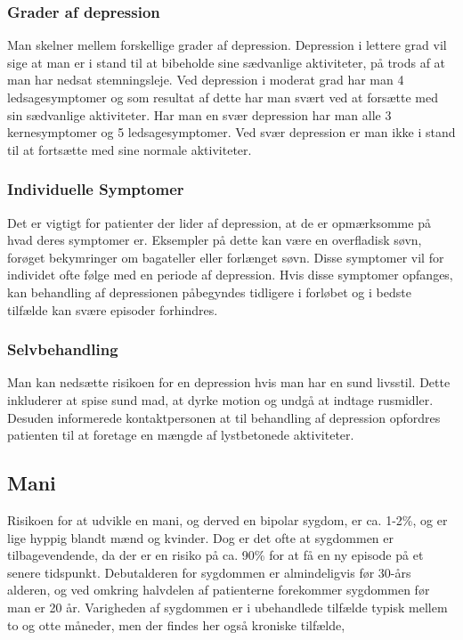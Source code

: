 \subsubsection{Grader af depression}
Man skelner mellem forskellige grader af depression.
Depression i lettere grad vil sige at man er i stand til at bibeholde sine sædvanlige aktiviteter, på trods af at man har nedsat stemningsleje.
Ved depression i moderat grad har man 4 ledsagesymptomer og som resultat af dette har man svært ved at forsætte med sin sædvanlige aktiviteter.
Har man en svær depression har man alle 3 kernesymptomer og 5 ledsagesymptomer.
Ved svær depression er man ikke i stand til at fortsætte med sine normale aktiviteter.

\subsubsection{Individuelle Symptomer}
Det er vigtigt for patienter der lider af depression, at de er opmærksomme på hvad deres symptomer er.
Eksempler på dette kan være en overfladisk søvn, forøget bekymringer om bagateller eller forlænget søvn.
Disse symptomer vil for individet ofte følge med en periode af depression.
Hvis disse symptomer opfanges, kan behandling af depressionen påbegyndes tidligere i forløbet og i bedste tilfælde kan svære episoder forhindres.
\subsubsection{Selvbehandling}
Man kan nedsætte risikoen for en depression hvis man har en sund livsstil.
Dette inkluderer at spise sund mad, at dyrke motion og undgå at indtage rusmidler.
Desuden informerede kontaktpersonen \citet{misc:janne-rasmussen} at til behandling af depression opfordres patienten til at foretage en mængde af lystbetonede aktiviteter.

\subsection{Mani}
Risikoen for at udvikle en mani, og derved en bipolar sygdom, er ca. 1-2\%, og er lige hyppig blandt mænd og kvinder.
Dog er det ofte at sygdommen er tilbagevendende, da der er en risiko på ca. 90\% for at få en ny episode på et senere tidspunkt.
Debutalderen for sygdommen er almindeligvis før 30-års alderen, og ved omkring halvdelen af patienterne forekommer sygdommen før man er 20 år.
Varigheden af sygdommen er i ubehandlede tilfælde typisk mellem to og otte måneder, men der findes her også kroniske tilfælde,

